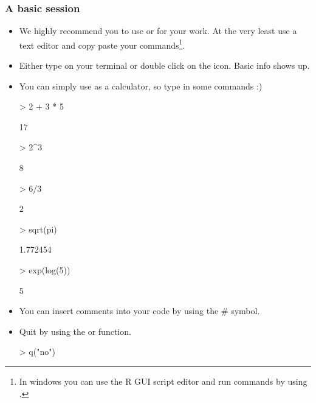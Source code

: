 \begin{frame}
  \frametitle{A basic  session}
  \begin{itemize}
  \item We highly recommend you to use  or  for your  work. At the very least use a text editor and copy paste your commands\footnote{In windows you can use the R GUI script editor and run commands by using .}.
  \item Either type  on your terminal or double click on the  icon. Basic info shows up.
  \item You can simply use  as a calculator, so type in some commands :)  
\begin{Schunk}
\begin{Sinput}
> 2 + 3 * 5
\end{Sinput}
\begin{Soutput}
[1] 17
\end{Soutput}
\begin{Sinput}
> 2^3
\end{Sinput}
\begin{Soutput}
[1] 8
\end{Soutput}
\begin{Sinput}
> 6/3
\end{Sinput}
\begin{Soutput}
[1] 2
\end{Soutput}
\begin{Sinput}
> sqrt(pi)
\end{Sinput}
\begin{Soutput}
[1] 1.772454
\end{Soutput}
\begin{Sinput}
> exp(log(5))
\end{Sinput}
\begin{Soutput}
[1] 5
\end{Soutput}
\end{Schunk}
  \item You can insert comments into your code by using the \# symbol.
  \item Quit by using the  or  function.
\begin{Schunk}
\begin{Sinput}
> q("no")
\end{Sinput}
\end{Schunk}
  \end{itemize}
\end{frame}

